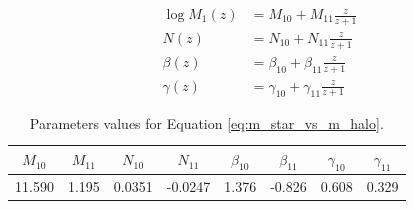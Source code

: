 \documentclass[fleqn, usenatbib]{mnras}
\begin{document}
\begin{align*}
	\log M_1(z) & = M_{10} + M_{11} \frac{z}{z + 1}           \\
	N(z)        & = N_{10} + N_{11} \frac{z}{z + 1}           \\
	\beta(z)    & = \beta_{10} + \beta_{11} \frac{z}{z + 1}   \\
	\gamma(z)   & = \gamma_{10} + \gamma_{11} \frac{z}{z + 1}
\end{align*}

\begin{table}
	\caption{Parameters values for Equation \ref{eq:m_star_vs_m_halo}.}
	\label{tab:m_star_vs_m_halo_parameters}
	\begin{tabular}{cccccccc}
		\hline
		\(M_{10}\) & \(M_{11}\) & \(N_{10}\) & \(N_{11}\) & \(\beta_{10}\) & \(\beta_{11}\) & \(\gamma_{10}\) & \(\gamma_{11}\) \\
		\hline
		11.590     & 1.195      & 0.0351     & -0.0247    & 1.376          & -0.826         & 0.608           & 0.329           \\
		\hline
	\end{tabular}
\end{table}

\end{document}
